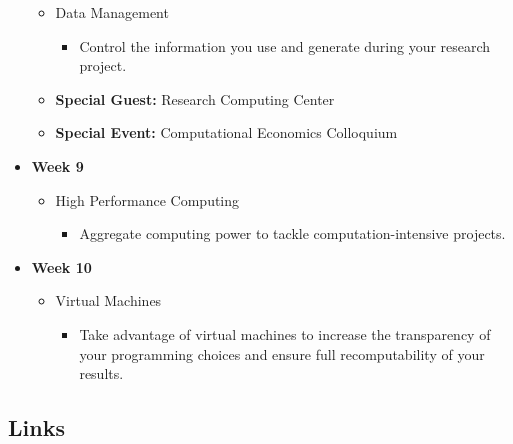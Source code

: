 \begin{itemize}
	\begin{itemize}
	\item Data Management	
		\begin{itemize}
		\item Control the information you use and generate during your research project.	
		\end{itemize}
	\item \textbf{Special Guest:} Research Computing Center
	\item \textbf{Special Event:} Computational Economics Colloquium
	\end{itemize}
\item \textbf{Week 9} 
	\begin{itemize}
	\item High Performance Computing
		\begin{itemize}
		\item Aggregate computing power to tackle computation-intensive projects.
		\end{itemize}
	\end{itemize}
\item \textbf{Week 10}  
	\begin{itemize}
	\item Virtual Machines
		\begin{itemize}
		\item Take advantage of virtual machines to increase the transparency of your programming choices and ensure full recomputability of your results.
		\end{itemize}
	\end{itemize}
\end{itemize}


\newpage\subsection*{Links}\vspace{0.5cm}

